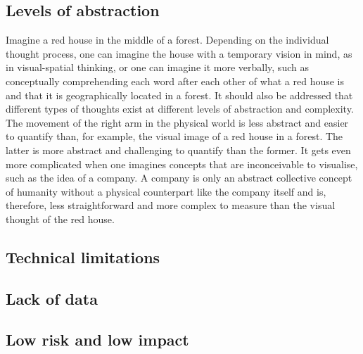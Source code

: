 \subsection{Levels of abstraction}
\label{chapter2-levels-of-abstraction}


Imagine a red house in the middle of a forest. Depending on the individual thought process, one can imagine the house with a temporary vision in mind, as in visual-spatial thinking, or one can imagine it more verbally, such as conceptually comprehending each word after each other of what a red house is and that it is geographically located in a forest. It should also be addressed that different types of thoughts exist at different levels of abstraction and complexity. The movement of the right arm in the physical world is less abstract and easier to quantify than, for example, the visual image of a red house in a forest. The latter is more abstract and challenging to quantify than the former. It gets even more complicated when one imagines concepts that are inconceivable to visualise, such as the idea of a company. A company is only an abstract collective concept of humanity without a physical counterpart like the company itself and is, therefore, less straightforward and more complex to measure than the visual thought of the red house.

\subsection{Technical limitations}
\label{chapter2-technical-limitations}


\subsection{Lack of data}
\label{chapter2-lack-of-data}

\subsection{Low risk and low impact}
\label{chapter2-low-risk-and-low-impact}




